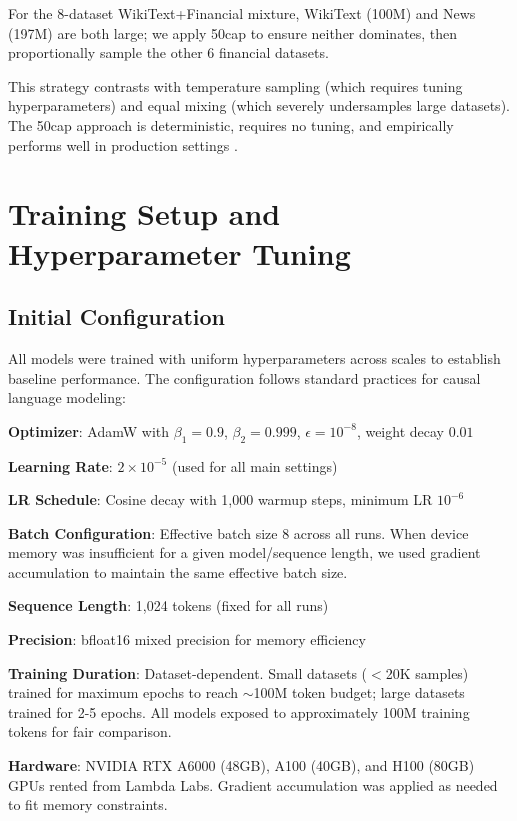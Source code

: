 For the 8-dataset WikiText+Financial mixture, WikiText (100M) and News (197M) are both large; we apply 50cap to ensure neither dominates, then proportionally sample the other 6 financial datasets.

This strategy contrasts with temperature sampling (which requires tuning hyperparameters) and equal mixing (which severely undersamples large datasets). The 50cap approach is deterministic, requires no tuning, and empirically performs well in production settings \parencite{longpre2023pretrainer}.

\section{Training Setup and Hyperparameter Tuning}

\subsection{Initial Configuration}

All models were trained with uniform hyperparameters across scales to establish baseline performance. The configuration follows standard practices for causal language modeling:

\textbf{Optimizer}: AdamW with $\beta_1=0.9$, $\beta_2=0.999$, $\epsilon=10^{-8}$, weight decay $0.01$

\textbf{Learning Rate}: $2 \times 10^{-5}$ (used for all main settings)

\textbf{LR Schedule}: Cosine decay with 1,000 warmup steps, minimum LR $10^{-6}$

\textbf{Batch Configuration}: Effective batch size 8 across all runs. When device memory was insufficient for a given model/sequence length, we used gradient accumulation to maintain the same effective batch size.

\textbf{Sequence Length}: 1,024 tokens (fixed for all runs)

\textbf{Precision}: bfloat16 mixed precision for memory efficiency

\textbf{Training Duration}: Dataset-dependent. Small datasets ($<$20K samples) trained for maximum epochs to reach $\sim$100M token budget; large datasets trained for 2-5 epochs. All models exposed to approximately 100M training tokens for fair comparison.

\textbf{Hardware}: NVIDIA RTX A6000 (48GB), A100 (40GB), and H100 (80GB) GPUs rented from Lambda Labs. Gradient accumulation was applied as needed to fit memory constraints.

